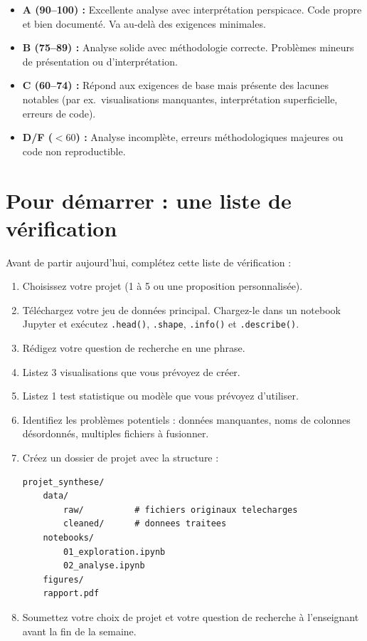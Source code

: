 \begin{itemize}
  \item \textbf{A (90--100) :} Excellente analyse avec interpr\'etation perspicace. Code propre et bien document\'e. Va au-del\`a des exigences minimales.
  \item \textbf{B (75--89) :} Analyse solide avec m\'ethodologie correcte. Probl\`emes mineurs de pr\'esentation ou d'interpr\'etation.
  \item \textbf{C (60--74) :} R\'epond aux exigences de base mais pr\'esente des lacunes notables (par ex.\ visualisations manquantes, interpr\'etation superficielle, erreurs de code).
  \item \textbf{D/F ($<60$) :} Analyse incompl\`ete, erreurs m\'ethodologiques majeures ou code non reproductible.
\end{itemize}

\section{Pour d\'emarrer : une liste de v\'erification}

\begin{exercise}
Avant de partir aujourd'hui, compl\'etez cette liste de v\'erification :
\begin{enumerate}
  \item Choisissez votre projet (1 \`a 5 ou une proposition personnalis\'ee).
  \item T\'el\'echargez votre jeu de donn\'ees principal. Chargez-le dans un notebook Jupyter et ex\'ecutez \texttt{.head()}, \texttt{.shape}, \texttt{.info()} et \texttt{.describe()}.
  \item R\'edigez votre question de recherche en une phrase.
  \item Listez 3 visualisations que vous pr\'evoyez de cr\'eer.
  \item Listez 1 test statistique ou mod\`ele que vous pr\'evoyez d'utiliser.
  \item Identifiez les probl\`emes potentiels : donn\'ees manquantes, noms de colonnes d\'esordonn\'es, multiples fichiers \`a fusionner.
  \item Cr\'eez un dossier de projet avec la structure :
\begin{verbatim}
projet_synthese/
    data/
        raw/          # fichiers originaux telecharges
        cleaned/      # donnees traitees
    notebooks/
        01_exploration.ipynb
        02_analyse.ipynb
    figures/
    rapport.pdf
\end{verbatim}
  \item Soumettez votre choix de projet et votre question de recherche \`a l'enseignant avant la fin de la semaine.
\end{enumerate}
\end{exercise}

